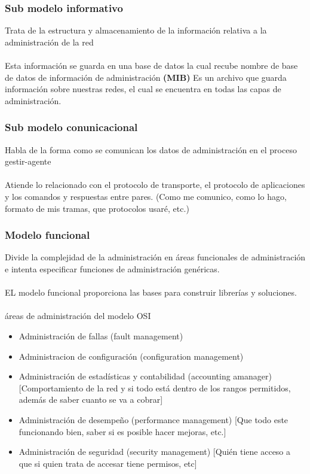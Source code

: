 \subsubsection{Sub modelo informativo}
Trata de la estructura y almacenamiento de la información relativa a la administración de la red \\\\
Esta información se guarda en una base de datos la cual recube nombre de base de datos de información de administración \textbf{(MIB)} Es un archivo que guarda información sobre nuestras redes, el cual se encuentra en todas las capas de administración.
\subsubsection{Sub modelo conunicacional}
Habla de la forma como se comunican los datos de administración en el proceso gestir-agente\\\\
Atiende lo relacionado con el protocolo de transporte, el protocolo de aplicaciones y los comandos y respuestas entre pares. (Como me comunico, como lo hago, formato de mis tramas, que protocolos usaré, etc.)

\subsubsection{Modelo funcional}
Divide la complejidad de la administración en áreas funcionales de administración e intenta especificar funciones de administración genéricas.\\\\
EL modelo funcional proporciona las bases para construir librerías y soluciones.\\\\
áreas de administración del modelo OSI
\begin{itemize}
    \item {Administración de fallas (fault management)}
    \item {Administracion de configuración (configuration management)}
    \item {Administración de estadísticas y contabilidad (accounting amanager) [Comportamiento de la red y si todo está dentro de los rangos permitidos, además de saber cuanto se va a cobrar]}
    \item {Administración de desempeño (performance management) [Que todo este funcionando bien, saber si es posible hacer mejoras, etc.]}
    \item {Administración de seguridad (security management) [Quién tiene acceso a que si quien trata de accesar tiene permisos, etc]}
\end{itemize}

